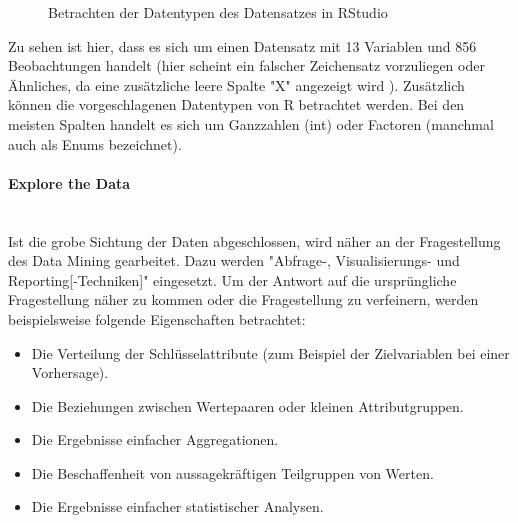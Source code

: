 \begin{figure}[H]
\centering
{}
\caption{Betrachten der Datentypen des Datensatzes in RStudio}
\label{fig:Lasagne_RStudio}
\end{figure}
Zu sehen ist hier, dass es sich um einen Datensatz mit 13 Variablen und 856 Beobachtungen handelt (hier scheint ein falscher Zeichensatz vorzuliegen oder Ähnliches, da eine zusätzliche leere Spalte "X" angezeigt wird ). Zusätzlich können die vorgeschlagenen Datentypen von R betrachtet werden. Bei den meisten Spalten handelt es sich um Ganzzahlen (int) oder Factoren (manchmal auch als Enums bezeichnet).

\paragraph{Explore the Data}\mbox{} \\
Ist die grobe Sichtung der Daten abgeschlossen, wird näher an der Fragestellung des Data Mining gearbeitet. Dazu werden "Abfrage-, Visualisierungs- und Reporting[-Techniken]"\citep[S.~16; eigene Übersetzung]{shearer_crisp-dm_2000} eingesetzt. Um der Antwort auf die ursprüngliche Fragestellung näher zu kommen oder die Fragestellung zu verfeinern, werden beispielsweise folgende Eigenschaften betrachtet\citep[S.~18; eigene Übersetzung]{chapman_crisp-dm_2000}:
\begin{itemize}
\item Die Verteilung der Schlüsselattribute (zum Beispiel der Zielvariablen bei einer Vorhersage).
\item Die Beziehungen zwischen Wertepaaren oder kleinen Attributgruppen.
\item Die Ergebnisse einfacher Aggregationen.
\item Die Beschaffenheit von aussagekräftigen Teilgruppen von Werten.
\item Die Ergebnisse einfacher statistischer Analysen.
\end{itemize}

